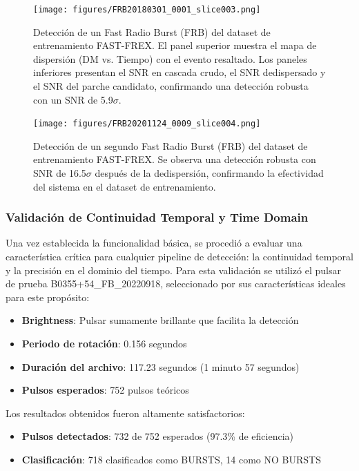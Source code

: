 \begin{figure}[H]
    \centering
    \texttt{[image: figures/FRB20180301\_0001\_slice003.png]}
    \caption[Detección FRB (FAST-FREX)]{Detección de un Fast Radio Burst (FRB) del dataset de entrenamiento FAST-FREX. El panel superior muestra el mapa de dispersión (DM vs. Tiempo) con el evento resaltado. Los paneles inferiores presentan el SNR en cascada crudo, el SNR dedispersado y el SNR del parche candidato, confirmando una detección robusta con un SNR de 5.9$\sigma$.}
    \label{fig:frb20180301_0001_slice003}
\end{figure}

\begin{figure}[H]
    \centering
    \texttt{[image: figures/FRB20201124\_0009\_slice004.png]}
    \caption[Detección FRB adicional (FAST-FREX)]{Detección de un segundo Fast Radio Burst (FRB) del dataset de entrenamiento FAST-FREX. Se observa una detección robusta con SNR de 16.5$\sigma$ después de la dedispersión, confirmando la efectividad del sistema en el dataset de entrenamiento.}
    \label{fig:frb20201124_0009_slice004}
\end{figure}

\subsubsection{Validación de Continuidad Temporal y Time Domain}

Una vez establecida la funcionalidad básica, se procedió a evaluar una característica crítica para cualquier pipeline de detección: la continuidad temporal y la precisión en el dominio del tiempo. Para esta validación se utilizó el pulsar de prueba B0355+54\_FB\_20220918, seleccionado por sus características ideales para este propósito:

\begin{itemize}
    \item \textbf{Brightness}: Pulsar sumamente brillante que facilita la detección
    \item \textbf{Periodo de rotación}: 0.156 segundos
    \item \textbf{Duración del archivo}: 117.23 segundos (1 minuto 57 segundos)
    \item \textbf{Pulsos esperados}: 752 pulsos teóricos
\end{itemize}

Los resultados obtenidos fueron altamente satisfactorios:
\begin{itemize}
    \item \textbf{Pulsos detectados}: 732 de 752 esperados (97.3\% de eficiencia)
    \item \textbf{Clasificación}: 718 clasificados como BURSTS, 14 como NO BURSTS
\end{itemize}

